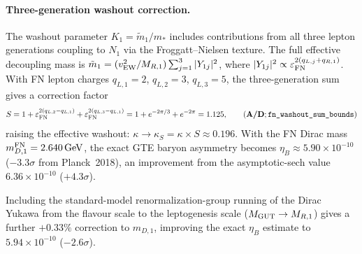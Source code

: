 \documentclass[11pt]{article}
\theoremstyle{remark}
\newcommand{\lean}[1]{%
  \penalty-100
  \begingroup\def\_{\textunderscore\allowbreak}\texttt{#1}\endgroup}
\newcommand{\CatAD}{\textbf{A/D}}
\begin{document}
\paragraph{Three-generation washout correction.}
The washout parameter $K_1 = \tilde{m}_1/m_*$ includes contributions from
all three lepton generations coupling to $N_1$ via the Froggatt--Nielsen texture.
The full effective decoupling mass is
$\tilde{m}_1 = (v_{\rm EW}^2/M_{R,1})\sum_{j=1}^3 |Y_{1j}|^2$,
where $|Y_{1j}|^2 \propto \varepsilon_{\rm FN}^{2(q_{L,j}+q_{R,1})}$.
With FN lepton charges $q_{L,1}=2$, $q_{L,2}=3$, $q_{L,3}=5$, the
three-generation sum gives a correction factor
\begin{equation}\label{eq:S_FN}
S = 1 + \varepsilon_{\rm FN}^{2(q_{L,2}-q_{L,1})}
     + \varepsilon_{\rm FN}^{2(q_{L,3}-q_{L,1})}
  = 1 + e^{-2\pi/3} + e^{-2\pi} = 1.125,
  \qquad (\CatAD; \lean{fn\_washout\_sum\_bounds})
\end{equation}
raising the effective washout: $\kappa \to \kappa_S = \kappa \times S \approx 0.196$.
With the FN Dirac mass $m_{D,1}^{\rm FN} = 2.640\,\text{GeV}$,
the exact GTE baryon asymmetry becomes
$\eta_B \approx 5.90\times10^{-10}$ ($-3.3\sigma$ from Planck~2018),
an improvement from the asymptotic-sech value $6.36\times10^{-10}$ ($+4.3\sigma$).

Including the standard-model renormalization-group running of the Dirac
Yukawa from the flavour scale to the leptogenesis scale
($M_{\rm GUT} \to M_{R,1}$)
gives a further $+0.33\%$ correction to $m_{D,1}$, improving the exact
$\eta_B$ estimate to $5.94 \times 10^{-10}$ ($-2.6\sigma$).
\end{document}
